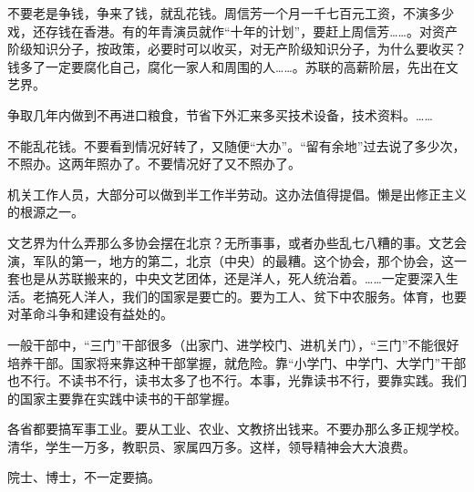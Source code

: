 不要老是争钱，争来了钱，就乱花钱。周信芳一个月一千七百元工资，不演多少戏，还存钱在香港。有的年青演员就作“十年的计划”，要赶上周信芳……。对资产阶级知识分子，按政策，必要时可以收买，对无产阶级知识分子，为什么要收买？钱多了一定要腐化自己，腐化一家人和周围的人……。苏联的高薪阶层，先出在文艺界。

争取几年内做到不再进口粮食，节省下外汇来多买技术设备，技术资料。……

不能乱花钱。不要看到情况好转了，又随便“大办”。“留有余地”过去说了多少次，不照办。这两年照办了。不要情况好了又不照办了。

机关工作人员，大部分可以做到半工作半劳动。这办法值得提倡。懒是出修正主义的根源之一。

文艺界为什么弄那么多协会摆在北京？无所事事，或者办些乱七八糟的事。文艺会演，军队的第一，地方的第二，北京（中央）的最糟。这个协会，那个协会，这一套也是从苏联搬来的，中央文艺团体，还是洋人，死人统治着。……一定要深入生活。老搞死人洋人，我们的国家是要亡的。要为工人、贫下中农服务。体育，也要对革命斗争和建设有益处的。

一般干部中，“三门”干部很多（出家门、进学校门、进机关门），“三门”不能很好培养干部。国家将来靠这种干部掌握，就危险。靠“小学门、中学门、大学门”干部也不行。不读书不行，读书太多了也不行。本事，光靠读书不行，要靠实践。我们的国家主要靠在实践中读书的干部掌握。

各省都要搞军事工业。要从工业、农业、文教挤出钱来。不要办那么多正规学校。清华，学生一万多，教职员、家属四万多。这样，领导精神会大大浪费。

院士、博士，不一定要搞。

